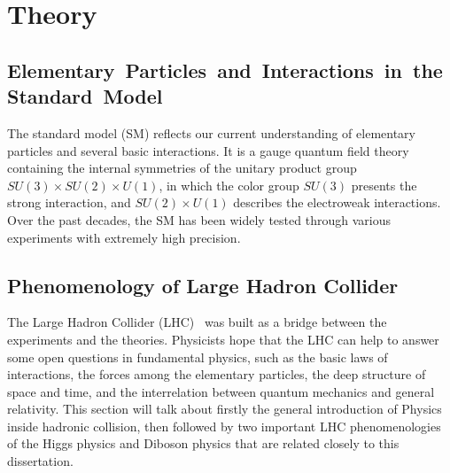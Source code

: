 
\chapter{Theory}

\section{Elementary Particles and Interactions in the Standard Model}
The standard model (SM) reflects our current understanding of elementary particles and several basic interactions.
It is a gauge quantum field theory containing the internal symmetries of the unitary product group $SU(3) \times SU(2) \times U(1)$, 
in which the color group $SU(3)$ presents the strong interaction, and $SU(2) \times U(1)$ describes the electroweak interactions.
Over the past decades, the SM has been widely tested through various experiments with extremely high precision.






\section{Phenomenology of Large Hadron Collider}
The Large Hadron Collider (LHC)~\cite{Bruning:2004ej, Buning:2004wk, Benedikt:2004wm} was built as a bridge between the experiments and the theories.
Physicists hope that the LHC can help to answer some open questions in fundamental physics, 
such as the basic laws of interactions, the forces among the elementary particles, 
the deep structure of space and time, and the interrelation between quantum mechanics and general relativity.
This section will talk about firstly the general introduction of Physics inside hadronic collision,
then followed by two important LHC phenomenologies of the Higgs physics and Diboson physics that are related closely to this dissertation.

